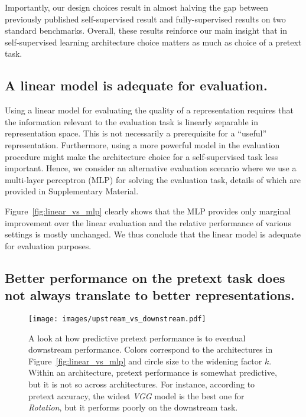 \documentclass[10pt,twocolumn,letterpaper]{article}
\begin{document}
Importantly, our design choices result in almost halving the gap between previously published self-supervised result and fully-supervised results on two standard benchmarks.
Overall, these results reinforce our main insight that in self-supervised learning architecture choice matters as much as choice of a pretext task.
\subsection{A linear model is adequate for evaluation.}
\label{subsec:nonlinear}

Using a linear model for evaluating the quality of a representation requires that the information relevant to the evaluation task is linearly separable in representation space.
This is not necessarily a prerequisite for a ``useful'' representation.
Furthermore, using a more powerful model in the evaluation procedure might make the architecture choice for a self-supervised task less important.
Hence, we consider an alternative evaluation scenario where we use a multi-layer perceptron (MLP) for solving the evaluation task, details of which are provided in Supplementary Material.


Figure~\ref{fig:linear_vs_mlp} clearly shows that the MLP provides only marginal improvement over the linear evaluation and the relative performance of various settings is mostly unchanged.
We thus conclude that the linear model is adequate for evaluation purposes.

\subsection{Better performance on the pretext task does not always translate to better representations.}
\label{subsec:updown}

\begin{figure}[t]
  \begin{center}
    \texttt{[image: images/upstream\_vs\_downstream.pdf]}
  \end{center}
  \caption{
     A look at how predictive pretext performance is to eventual downstream performance.
     Colors correspond to the architectures in Figure~\ref{fig:linear_vs_mlp} and circle size to the widening factor $k$.
     Within an architecture, pretext performance is somewhat predictive, but it is not so across architectures.
     For instance, according to pretext accuracy, the widest \emph{VGG} model is the best one for \emph{Rotation}, but it performs poorly on the downstream task.
  }\label{fig:updown}
\end{figure}
\end{document}
